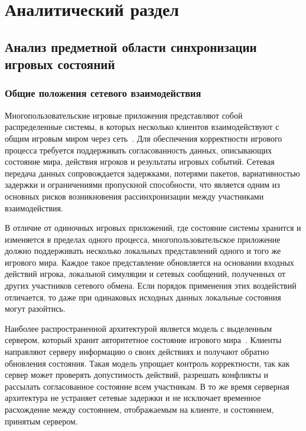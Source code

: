 \chapter{Аналитический раздел}\label{analysis}

\section{Анализ предметной области синхронизации игровых состояний}

\subsection{Общие положения сетевого взаимодействия}

Многопользовательские игровые приложения представляют собой распределенные системы, в которых несколько клиентов взаимодействуют с общим игровым миром через сеть~\cite{smed2002networkgames, tanenbaum2017distributed}. Для обеспечения корректности игрового процесса требуется поддерживать согласованность данных, описывающих состояние мира, действия игроков и результаты игровых событий. Сетевая передача данных сопровождается задержками, потерями пакетов, вариативностью задержки и ограничениями пропускной способности, что является одним из основных рисков возникновения рассинхронизации между участниками взаимодействия.

В отличие от одиночных игровых приложений, где состояние системы хранится и изменяется в пределах одного процесса, многопользовательское приложение должно поддерживать несколько локальных представлений одного и того же игрового мира. Каждое такое представление обновляется на основании входных действий игрока, локальной симуляции и сетевых сообщений, полученных от других участников сетевого обмена. Если порядок применения этих воздействий отличается, то даже при одинаковых исходных данных локальные состояния могут разойтись.

Наиболее распространенной архитектурой является модель с выделенным сервером, который хранит авторитетное состояние игрового мира~\cite{gamedevnetsync}. Клиенты направляют серверу информацию о своих действиях и получают обратно обновления состояния. Такая модель упрощает контроль корректности, так как сервер может проверять допустимость действий, разрешать конфликты и рассылать согласованное состояние всем участникам. В то же время серверная архитектура не устраняет сетевые задержки и не исключает временное расхождение между состоянием, отображаемым на клиенте, и состоянием, принятым сервером.


